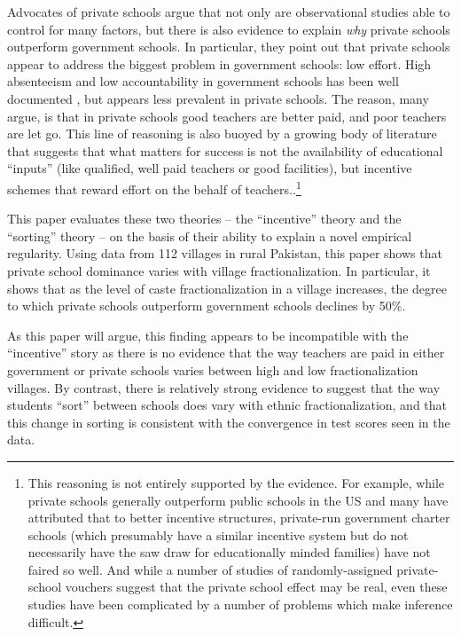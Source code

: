 

Advocates of private schools argue that not only are observational studies able to control for many factors, but there is also evidence to explain \emph{why} private schools outperform government schools. In particular, they point out that private schools appear to address the biggest problem in government schools: low effort. High absenteeism and low accountability in government schools has been well documented \citep{Muralidharan:2008tb, Chaudhury:2006vp}, but appears less prevalent in private schools. The reason, many argue, is that in private schools good teachers are better paid, and poor teachers are let go\citep{Andrabi:2007we}. This line of reasoning is also buoyed by a growing body of literature that suggests that what matters for success is not the availability of educational ``inputs'' (like qualified, well paid teachers or good facilities), but incentive schemes that reward effort on the behalf of teachers.\citep{Hanushek:1997tt,Hanushek:2003hz,Banerjee:2007wx}.\footnote{This reasoning is not entirely supported by the evidence. For example, while private schools generally outperform public schools in the US and many have attributed that to better incentive structures, private-run government charter schools (which presumably have a similar incentive system but do not necessarily have the saw draw for educationally minded families) have not faired so well.\citep{Fuller:2002td} And while a number of studies of randomly-assigned private-school vouchers suggest that the private school effect may be real, even these studies have been complicated by a number of problems which make inference difficult.} 


This paper evaluates these two theories -- the ``incentive'' theory and the ``sorting'' theory -- on the basis of their ability to explain a novel empirical regularity. Using data from 112 villages in rural Pakistan, this paper shows that private school dominance varies with village fractionalization. In particular, it shows that as the level of caste fractionalization in a village increases, the degree to which private schools outperform government schools declines by 50\%. 

As this paper will argue, this finding appears to be incompatible with the ``incentive'' story as there is no evidence that the way teachers are paid in either government or private schools varies between high and low fractionalization villages. By contrast, there is relatively strong evidence to suggest that the way students ``sort'' between schools does vary with ethnic fractionalization, and that this change in sorting is consistent with the convergence in test scores seen in the data. 



